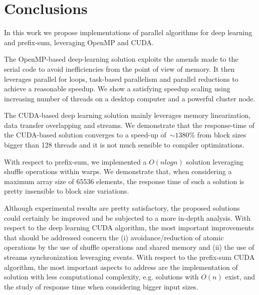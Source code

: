 \section{Conclusions}
\label{sec:conclusions}

In this work we propose implementations of parallel algorithms for deep learning and prefix-sum, leveraging OpenMP and CUDA.



The OpenMP-based deep-learning solution exploits the amends made to the serial code to avoid inefficiencies from the
point of view of memory. It then leverages parallel for loops, task-based parallelism and parallel
reductions to achieve a reasonable speedup. We show a satisfying speedup scaling using increasing number of threads on a desktop computer and a powerful cluster node.

The CUDA-based deep learning solution mainly leverages memory linearization, data transfer overlapping and streams.
We demonstrate that the response-time of the CUDA-based solution converges to a speed-up of~$\sim \! 1380\%$ from block sizes bigger than 128 threads and it is not much sensible to compiler optimizations.

With respect to prefix-sum, we implemented a $O(nlogn)$ solution leveraging shuffle operations within warps. We demonstrate that, when considering a maximum array size of 65536 elements, the response time of such a solution is pretty insensible to block size variations.

Although experimental results are pretty satisfactory, the proposed solutions could certainly be improved and be subjected to a more in-depth analysis.
%
With respect to the deep learning CUDA algorithm, the most important improvements that should be addressed concern the (i) avoidance/reduction of atomic operations by the use of shuffle operations and shared memory and
(ii) the use of streams synchronization leveraging events.
%
With respect to the prefix-sum CUDA algorithm, the most important aspects to address are the implementation of solution with less computational complexity, e.g. solutions with $O(n)$ exist, and the study of response time when considering bigger input sizes.
